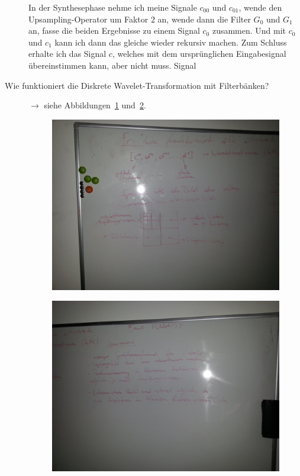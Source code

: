 \begin{description}
  	In der Synthesephase nehme ich meine Signale $ c_{00} $ und $ c_{01} $, wende den 
  	Upsampling-Operator um Faktor $ 2 $ an, wende dann die Filter $ G_{0} $ und $ G_{1} $ an, fasse 
  	die beiden Ergebnisse zu einem Signal $ c_{0} $ zusammen. Und mit $ c_{0} $ und $ c_{1} $ kann 
  	ich dann das gleiche wieder rekursiv machen. Zum Schluss erhalte ich das Signal $ c $, welches 
  	mit dem ursprünglichen Eingabesignal übereinstimmen kann, aber nicht muss.
  	Signal 
  \item [Wie funktioniert die Diskrete Wavelet-Transformation mit Filterbänken?] 
    $ \rightarrow $ siehe Abbildungen~\ref{fig:Filterbank2} und~\ref{fig:Filterbank3}.
    \begin{figure}[ht]
    \centering
    \includegraphics[width=\linewidth]{Fotos/Filterbank2}
    \caption{}
    \label{fig:Filterbank2}
    \end{figure}
    \begin{figure}[ht]
    \centering
    \includegraphics[width=\linewidth]{Fotos/Filterbank3}
    \caption{}
    \label{fig:Filterbank3}
    \end{figure}
\end{description}

